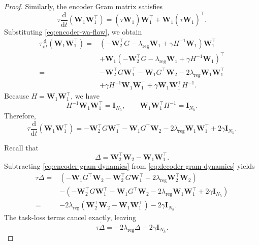 \documentclass{article} %
\newcommand{\wa}{\mathbf{W}_1}
\newcommand{\wb}{\mathbf{W}_2}
\theoremstyle{remark}
\begin{document}
\begin{proof}
Similarly, the encoder Gram matrix satisfies
\[
\tau\frac{\mathrm{d}}{\mathrm{d}t}
\left(\wa\wa^\top\right)
=
\left(\tau\dot{\wa}\right)\wa^\top
+
\wa\left(\tau\dot{\wa}\right)^\top.
\]
Substituting \eqref{eq:encoder-wa-flow}, we obtain
\begin{align}
\tau\frac{\mathrm{d}}{\mathrm{d}t}
\left(\wa\wa^\top\right)
={}&
\left(
-\wb^\top G
-\lambda_{\mathrm{reg}}\wa
+\gamma H^{-1}\wa
\right)\wa^\top
\nonumber\\
&+
\wa
\left(
-\wb^\top G
-\lambda_{\mathrm{reg}}\wa
+\gamma H^{-1}\wa
\right)^\top
\nonumber\\
={}&
-\wb^\top G\wa^\top
-\wa G^\top\wb
-2\lambda_{\mathrm{reg}}\wa\wa^\top
\nonumber\\
&+
\gamma H^{-1}\wa\wa^\top
+
\gamma\wa\wa^\top H^{-1}.
\end{align}
Because $H=\wa\wa^\top$, we have
\[
H^{-1}\wa\wa^\top=\mathbf{I}_{N_h},
\qquad
\wa\wa^\top H^{-1}=\mathbf{I}_{N_h}.
\]
Therefore,
\begin{equation}
\tau\frac{\mathrm{d}}{\mathrm{d}t}
\left(\wa\wa^\top\right)
=
-\wb^\top G\wa^\top
-\wa G^\top\wb
-2\lambda_{\mathrm{reg}}\wa\wa^\top
+2\gamma\mathbf{I}_{N_h}.
\label{eq:encoder-gram-dynamics}
\end{equation}

Recall that
\[
\Delta=\wb^\top\wb-\wa\wa^\top.
\]
Subtracting \eqref{eq:encoder-gram-dynamics} from
\eqref{eq:decoder-gram-dynamics} yields
\begin{align}
\tau\dot{\Delta}
={}&
\left(
-\wa G^\top\wb
-\wb^\top G\wa^\top
-2\lambda_{\mathrm{reg}}\wb^\top\wb
\right)
\nonumber\\
&-
\left(
-\wb^\top G\wa^\top
-\wa G^\top\wb
-2\lambda_{\mathrm{reg}}\wa\wa^\top
+2\gamma\mathbf{I}_{N_h}
\right)
\nonumber\\
={}&
-2\lambda_{\mathrm{reg}}
\left(
\wb^\top\wb-\wa\wa^\top
\right)
-2\gamma\mathbf{I}_{N_h}.
\end{align}
The task-loss terms cancel exactly, leaving
\[
\boxed{
\tau\dot{\Delta}
=
-2\lambda_{\mathrm{reg}}\Delta
-2\gamma\mathbf{I}_{N_h}
}.
\]


\end{proof}
\end{document}
